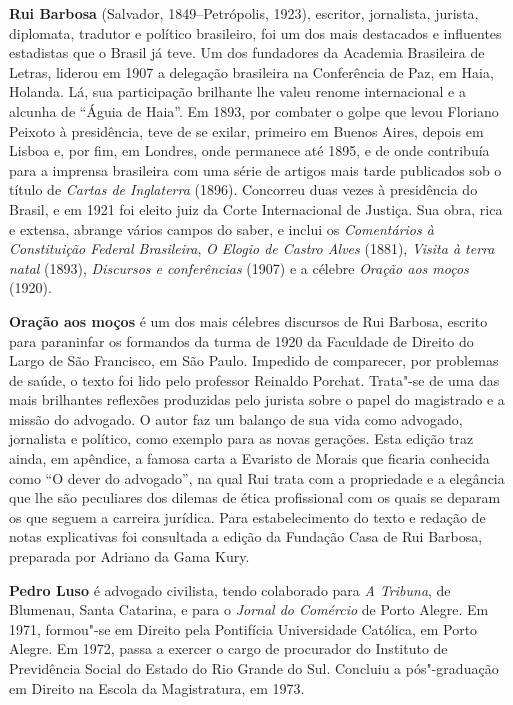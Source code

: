 \textbf{Rui Barbosa} (Salvador, 1849--Petrópolis, 1923), escritor, jornalista, 
jurista, diplomata, tradutor e político brasileiro, foi um dos mais destacados 
e influentes estadistas que o Brasil já teve. Um dos fundadores da Academia 
Brasileira de Letras, liderou em 1907 a delegação brasileira na Conferência 
de Paz, em Haia, Holanda. Lá, sua participação brilhante lhe valeu renome 
internacional e a alcunha de “Águia de Haia”. Em 1893, por combater o golpe 
que levou Floriano Peixoto à presidência, teve de se exilar, primeiro em  
Buenos Aires, depois em Lisboa e, por fim, em Londres, onde permanece até 
1895, e de onde contribuía para a imprensa brasileira com uma série de 
artigos mais tarde publicados sob o título de \textit{Cartas de Inglaterra} 
(1896). Concorreu duas vezes à presidência do Brasil, e em 1921 foi eleito 
juiz da Corte Internacional de Justiça. Sua obra, rica e extensa, abrange 
vários campos do saber, e inclui os \textit{Comentários à Constituição 
Federal Brasileira}, \textit{O Elogio de Castro Alves} (1881), 
\textit{Visita à terra natal} (1893), \textit{Discursos e conferências} 
(1907) e a célebre \textit{Oração aos moços} (1920).

\textbf{Oração aos moços} é um dos mais célebres discursos de Rui
Barbosa, escrito para paraninfar os formandos da
turma de 1920 da Faculdade de Direito do Largo de São Francisco, em São
Paulo. Impedido de comparecer,  por problemas de saúde, o texto foi
lido pelo professor Reinaldo Porchat. Trata"-se de uma das mais
brilhantes reflexões produzidas pelo jurista sobre o papel do
magistrado e a missão do advogado. O autor faz um balanço de sua vida
como advogado, jornalista e político, como exemplo para as novas
gerações. Esta edição traz ainda, em apêndice, a famosa carta
a Evaristo de Morais que ficaria conhecida como ``O dever do advogado'',
na qual Rui trata com a propriedade e a elegância que lhe são peculiares
dos dilemas de ética profissional com os quais se deparam os que 
seguem a carreira jurídica. Para estabelecimento do texto e redação de notas explicativas foi consultada a edição da Fundação Casa de Rui Barbosa, preparada por Adriano da Gama Kury.



\textbf{Pedro Luso} é advogado civilista, tendo colaborado para \textit{A Tribuna}, 
de  Blumenau, Santa Catarina, e para o \textit{Jornal do Comércio} de Porto Alegre.  
Em 1971, formou"-se em  Direito pela Pontifícia Universidade Católica, 
em Porto Alegre.  Em 1972,  passa a exercer o cargo de procurador do 
Instituto de Previdência  Social do Estado do Rio Grande do Sul.  
Concluiu a pós"-graduação em Direito na Escola da Magistratura, em 1973. 


